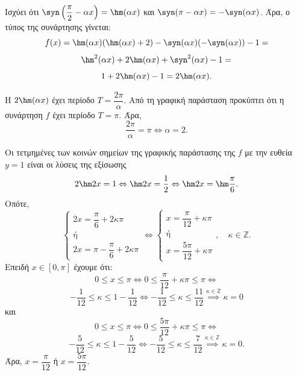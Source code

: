 \begin{alist}
\item
\begin{rlist}
\item Ισχύει ότι $\syn \left(\dfrac{\pi}{2} - \alpha x\right) = \hm (\alpha x)$ και $\syn (\pi - \alpha x) = -\syn (\alpha x)$. Άρα, ο τύπος της συνάρτησης γίνεται:
\[f(x) = \hm (\alpha x)(\hm (\alpha x) + 2) - \syn (\alpha x)(-\syn (\alpha x)) - 1 =\]
\[\hm ^2(\alpha x) + 2\hm (\alpha x) + \syn ^2(\alpha x) - 1 =\]
\[1 + 2\hm (\alpha x) - 1 = 2\hm (\alpha x).\]
\item Η $2\hm (\alpha x)$ έχει περίοδο $T = \dfrac{2\pi}{\alpha}$. Από τη γραφική παράσταση προκύπτει ότι η συνάρτηση $f$ έχει περίοδο $T = \pi$. Άρα,
\[\dfrac{2\pi}{\alpha} = \pi \Leftrightarrow \alpha = 2.\]
\end{rlist}
\item Οι τετμημένες των κοινών σημείων της γραφικής παράστασης της $f$ με την ευθεία $y = 1$ είναι οι λύσεις της εξίσωσης
\[2\hm  2x = 1 \Leftrightarrow \hm  2x = \dfrac{1}{2} \Leftrightarrow \hm  2x = \hm \dfrac{\pi}{6}.\]
Οπότε,
\[\begin{cases} 2x = \dfrac{\pi}{6} + 2\kappa\pi \\ \text{ή} \\ 2x = \pi - \dfrac{\pi}{6} + 2\kappa\pi \end{cases} \Leftrightarrow \begin{cases} x = \dfrac{\pi}{12} + \kappa\pi \\ \text{ή} \\ x = \dfrac{5\pi}{12} + \kappa\pi \end{cases}, \quad \kappa \in \mathbb{Z}.\]
Επειδή $x \in [0, \pi]$ έχουμε ότι:
\[0 \le x \le \pi \Leftrightarrow 0 \le \dfrac{\pi}{12} + \kappa\pi \le \pi \Leftrightarrow\]
\[-\dfrac{1}{12} \le \kappa \le 1 - \dfrac{1}{12} \Leftrightarrow -\dfrac{1}{12} \le \kappa \le \dfrac{11}{12} \overset{\kappa \in \mathbb{Z}}{\implies} \kappa = 0\]
και
\[0 \le x \le \pi \Leftrightarrow 0 \le \dfrac{5\pi}{12} + \kappa\pi \le \pi \Leftrightarrow\]
\[-\dfrac{5}{12} \le \kappa \le 1 - \dfrac{5}{12} \Leftrightarrow -\dfrac{5}{12} \le \kappa \le \dfrac{7}{12} \overset{\kappa \in \mathbb{Z}}{\implies} \kappa = 0.\]
Άρα, $x = \dfrac{\pi}{12}$ ή $x = \dfrac{5\pi}{12}$.
\end{alist}

